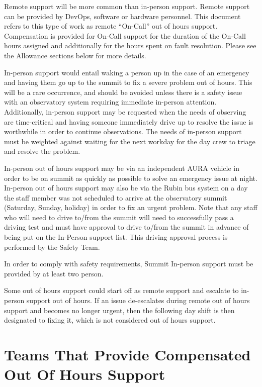 Remote support will be more common than in-person support.  Remote support can be provided by DevOps, software or hardware personnel.  This document refers to this type of work as remote ``On-Call'' out of hours support. Compensation is provided for On-Call support for the duration of the On-Call hours assigned and additionally for the hours spent on fault resolution.  Please see the Allowance sections below for more details.

In-person support would entail waking a person up in the case of an emergency and having them go up to the summit to fix a severe problem out of hours. 
This will be a rare occurrence, and should be avoided unless there is a safety issue with an observatory system requiring immediate in-person attention.
Additionally, in-person support may be requested when the needs of observing are time-critical and having someone immediately drive up to resolve the issue is worthwhile in order to continue observations.  
The needs of in-person support must be weighted against waiting for the next workday for the day crew to triage and resolve the problem.

In-person out of hours support may be via an independent AURA vehicle in order to be on summit as quickly as possible to solve an emergency issue at night.  In-person out of hours support may also be via the Rubin bus system on a day the staff member was not scheduled to arrive at the observatory summit (Saturday, Sunday, holiday) in order to fix an urgent problem.  Note that any staff who will need to drive to/from the summit will need to successfully pass a driving test and must have approval to drive to/from the summit in advance of being put on the In-Person support list.  This driving approval process is performed by the Safety Team.

In order to comply with safety requirements, Summit In-person support must be provided by at least two person.

Some out of hours support could start off as remote support and escalate to in-person support out of hours.  If an issue de-escalates during remote out of hours support and becomes no longer urgent, then the following day shift is then designated to fixing it, which is not considered out of hours support.

\section{Teams That Provide Compensated Out Of Hours Support}

